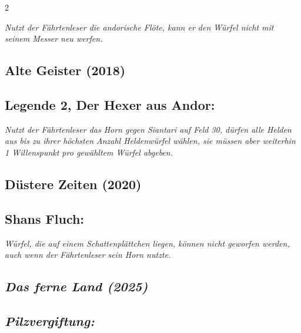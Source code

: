 \documentclass[10pt, a4paper, oneside]{book}
\newcommand{\fan}[1]{\textit{#1}}
\begin{document}
\begin{multicols*}{2}
\begin{bgcolor}
\fan{Nutzt der Fährtenleser die andorische Flöte, kann er den Würfel nicht mit seinem Messer neu werfen.}

\end{bgcolor}






\begin{bgcolor}[color-AG]
\section{Alte Geister (2018)}

\subsection{Legende 2, Der Hexer aus Andor:}

\fan{Nutzt der Fährtenleser das Horn gegen Siantari auf Feld 30, dürfen alle Helden aus bis zu ihrer höchsten Anzahl Heldenwürfel wählen, sie müssen aber weiterhin 1 Willenspunkt pro gewähltem Würfel abgeben.}

\end{bgcolor}




\begin{bgcolor}[color-DZ]
\section{Düstere Zeiten (2020)}

\subsection{Shans Fluch:}

\fan{Würfel, die auf einem Schattenplättchen liegen, können nicht geworfen werden, auch wenn der Fährtenleser sein Horn nutzte.}

\end{bgcolor}



\columnbreak


\begin{bgcolor}
\section{\fan{Das ferne Land (2025)}}

\subsection{\fan{Pilzvergiftung:}}


\end{bgcolor}
\end{multicols*}
\end{document}

